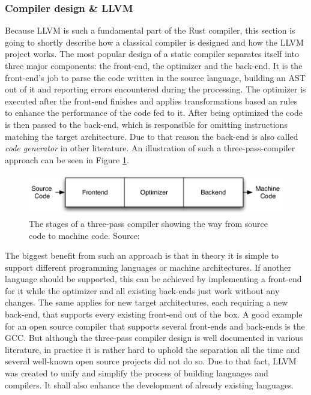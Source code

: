 \subsubsection{Compiler design \& LLVM}

Because \ac{LLVM} is such a fundamental part of the Rust compiler, this section is going to shortly describe how a classical compiler is designed and how the \ac{LLVM} project works.
The most popular design of a static compiler separates itself into three major components: the front-end, the optimizer and the back-end. It is the front-end's job to parse the code written in the source language, building an \ac{AST} out of it and reporting errors encountered during the processing. The optimizer is executed after the front-end finishes and applies transformations based an rules to enhance the performance of the code fed to it. After being optimized the code is then passed to the back-end, which is responsible for omitting instructions matching the target architecture. Due to that reason the back-end is also called \textit{code generator} in other literature. An illustration of such a three-pass-compiler approach can be seen in Figure \ref{fig:compiler_design}.

\begin{figure}[h!]
	\centering \includegraphics[width=\linewidth]{PICs/compiler_design.png}
	\caption{The stages of a three-pass compiler showing the way from source code to machine code. Source: \cite{LLVM_ARCH}}
	\label{fig:compiler_design}
\end{figure}

The biggest benefit from such an approach is that in theory it is simple to support different programming languages or machine architectures. If another language should be supported, this can be achieved by implementing a front-end for it while the optimizer and all existing back-ends just work without any changes. The same applies for new target architectures, each requiring a new back-end, that supports every existing front-end out of the box. A good example for an open source compiler that supports several front-ends and back-ends is the GCC. But although the three-pass compiler design is well documented in various literature, in practice it is rather hard to uphold the separation all the time and several well-known open source projects did not do so. Due to that fact, \ac{LLVM} was created to unify and simplify the process of building languages and compilers. It shall also enhance the development of already existing languages.

